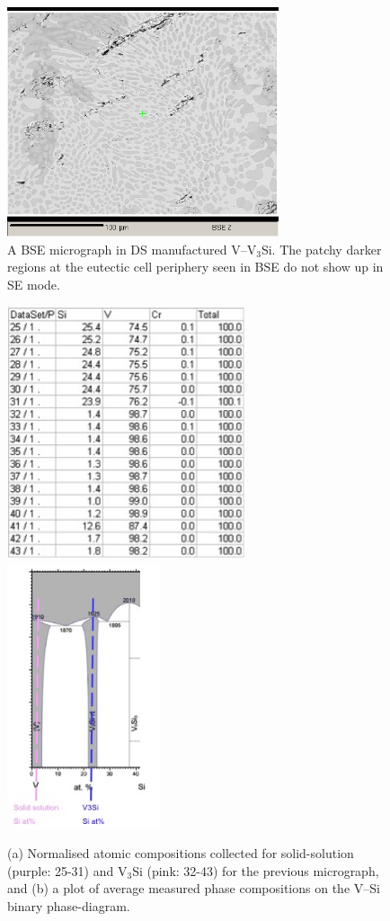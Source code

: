 %
%
\begin{figure}[H]
\begin{center}
\includegraphics[width=8cm]{_Jun19_09vv3si_long_50um_middle_i_bse_scale}
\caption{A BSE micrograph in DS manufactured V--V$_3$Si.  The patchy darker regions at the eutectic cell periphery seen in BSE do not show up in SE mode.}
\label{fig:Vpointslongmiddle}
\end{center}
\end{figure}
%
%
\begin{figure}[H]
\begin{center}
\includegraphics[width=7cm]{vmirrorSSandX3Sidata}
\includegraphics[width=4.5cm]{vmirrorSSandX3Siphasediag}
\caption{(a) Normalised atomic compositions collected for solid-solution (purple: 25-31) and V$_3$Si (pink: 32-43) for the previous micrograph, and (b) a plot of average measured phase compositions on the V--Si binary phase-diagram.}
\label{fig:VPD}
\end{center}
\end{figure}
